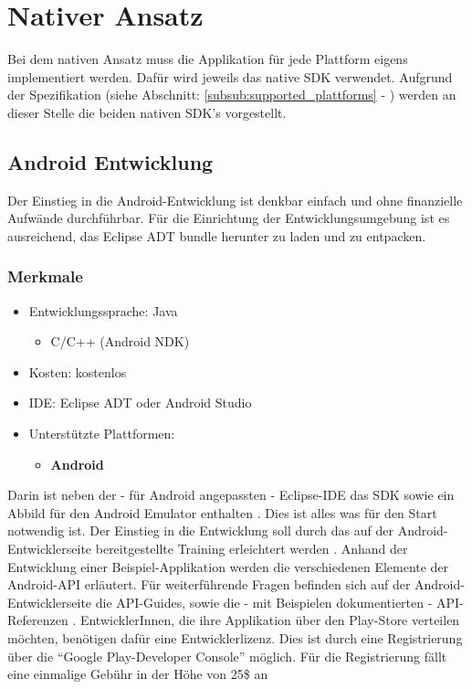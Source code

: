 \documentclass[../Bachelorarbeit.tex]{subfiles}
\begin{document}
\section{Nativer Ansatz}
\label{sec:nativer_ansatz}
Bei dem nativen Ansatz muss die Applikation für jede Plattform eigens implementiert werden.
Dafür wird jeweils das native \ac{SDK} verwendet.
Aufgrund der Spezifikation (siehe Abschnitt: \ref{subsub:supported_plattforms} - ) werden an dieser Stelle die beiden nativen \ac{SDK}'s vorgestellt.


\subsection*{Android Entwicklung}
Der Einstieg in die Android-Entwicklung ist denkbar einfach und ohne finanzielle Aufwände durchführbar. 
Für die Einrichtung der Entwicklungsumgebung ist es ausreichend, das Eclipse ADT bundle herunter zu laden und zu entpacken. 

\subsubsection*{Merkmale}
\begin{itemize}
\item Entwicklungssprache: Java 
\begin{itemize}
\item C/C++ (Android \ac{NDK})
\end{itemize}
\item Kosten:  kostenlos
\item \ac{IDE}: Eclipse \ac{ADT} oder Android Studio
\item Unterstützte Plattformen: 
\begin{itemize}
\item \textbf{Android}
\end{itemize}
\end{itemize}

Darin ist neben der - für Android angepassten - Eclipse-\ac{IDE} das \ac{SDK} sowie ein Abbild für den Android Emulator enthalten \parencite[siehe][]{android_getTheSdk}. 
Dies ist alles was für den Start notwendig ist. 
Der Einstieg in die Entwicklung soll durch das auf der Android-Entwicklerseite bereitgestellte Training erleichtert werden \parencite[siehe][]{android_training}. 
Anhand der Entwicklung einer Beispiel-Applikation werden die verschiedenen Elemente der Android-\ac{API} erläutert.
Für weiterführende Fragen befinden sich auf der Android-Entwicklerseite die  \ac{API}-Guides, sowie die - mit Beispielen dokumentierten - \ac{API}-Referenzen \parencites[vgl.][]{android_api_guides}[sowie][]{android_api_ref}.
EntwicklerInnen, die ihre Applikation über den Play-Store verteilen möchten, benötigen dafür eine Entwicklerlizenz.
Dies ist durch eine Registrierung über die "`Google Play-Developer Console"' möglich. Für die Registrierung fällt eine einmalige Gebühr in der Höhe von 25\$ an \parencite[vgl.][]{android_entwicklerregistrierung}
\end{document}

